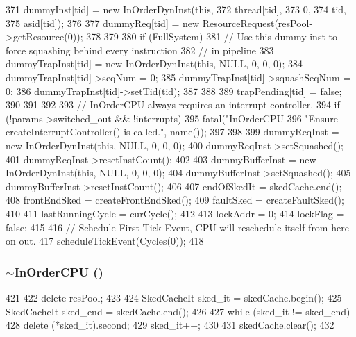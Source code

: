 \begin{DoxyCode}
{{371         dummyInst[tid] = new InOrderDynInst(this, 
372                                             thread[tid], 
373                                             0, 
374                                             tid, 
375                                             asid[tid]);
376 
377         dummyReq[tid] = new ResourceRequest(resPool->getResource(0));
378 
379 
380         if (FullSystem) {
381             // Use this dummy inst to force squashing behind every instruction
382             // in pipeline
383             dummyTrapInst[tid] = new InOrderDynInst(this, NULL, 0, 0, 0);
384             dummyTrapInst[tid]->seqNum = 0;
385             dummyTrapInst[tid]->squashSeqNum = 0;
386             dummyTrapInst[tid]->setTid(tid);
387         }
388 
389         trapPending[tid] = false;
390 
391     }
392 
393     // InOrderCPU always requires an interrupt controller.
394     if (!params->switched_out && !interrupts) {
395         fatal("InOrderCPU %
396               "Ensure createInterruptController() is called.\n", name());
397     }
398 
399     dummyReqInst = new InOrderDynInst(this, NULL, 0, 0, 0);
400     dummyReqInst->setSquashed();
401     dummyReqInst->resetInstCount();
402 
403     dummyBufferInst = new InOrderDynInst(this, NULL, 0, 0, 0);
404     dummyBufferInst->setSquashed();
405     dummyBufferInst->resetInstCount();
406 
407     endOfSkedIt = skedCache.end();
408     frontEndSked = createFrontEndSked();
409     faultSked = createFaultSked();
410 
411     lastRunningCycle = curCycle();
412 
413     lockAddr = 0;
414     lockFlag = false;
415     
416     // Schedule First Tick Event, CPU will reschedule itself from here on out.
417     scheduleTickEvent(Cycles(0));
418 }
\end{DoxyCode}
\hypertarget{classInOrderCPU_a9b26cce2959103d12295be716fe47b10}{
\subsubsection[{$\sim$InOrderCPU}]{\setlength{\rightskip}{0pt plus 5cm}$\sim${\bf InOrderCPU} ()}}
\label{classInOrderCPU_a9b26cce2959103d12295be716fe47b10}



\begin{DoxyCode}
421 {
422     delete resPool;
423 
424     SkedCacheIt sked_it = skedCache.begin();
425     SkedCacheIt sked_end = skedCache.end();
426 
427     while (sked_it != sked_end) {
428         delete (*sked_it).second;
429         sked_it++;
430     }
431     skedCache.clear();
432 }
\end{DoxyCode}



